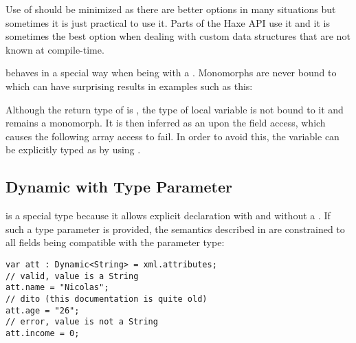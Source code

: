 
Use of  should be minimized as there are better options in many situations but sometimes it is just practical to use it. Parts of the Haxe  API use it and it is sometimes the best option when dealing with custom data structures that are not known at compile-time.

 behaves in a special way when being  with a . Monomorphs are never bound to  which can have surprising results in examples such as this:


Although the return type of  is , the type of local variable  is not bound to it and remains a monomorph. It is then inferred as an  upon the  field access, which causes the following  array access to fail. In order to avoid this, the variable  can be explicitly typed as  by using .


\subsection{Dynamic with Type Parameter}
\label{types-dynamic-with-type-parameter}

 is a special type because it allows explicit declaration with and without a . If such a type parameter is provided, the semantics described in  are constrained to all fields being compatible with the parameter type:

\begin{lstlisting}
var att : Dynamic<String> = xml.attributes;
// valid, value is a String
att.name = "Nicolas";
// dito (this documentation is quite old)
att.age = "26";
// error, value is not a String
att.income = 0;
\end{lstlisting}



